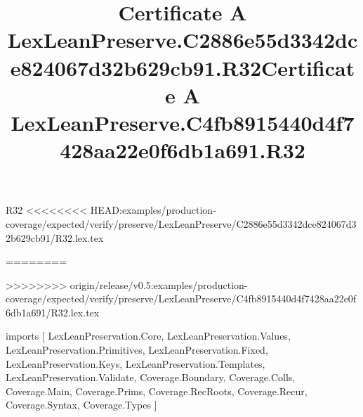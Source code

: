 \begin{lexlean}{R32}
<<<<<<<< HEAD:examples/production-coverage/expected/verify/preserve/LexLeanPreserve/C2886e55d3342dce824067d32b629cb91/R32.lex.tex
\title{Certificate A LexLeanPreserve.C2886e55d3342dce824067d32b629cb91.R32}
========
\title{Certificate A LexLeanPreserve.C4fb8915440d4f7428aa22e0f6db1a691.R32}
>>>>>>>> origin/release/v0.5:examples/production-coverage/expected/verify/preserve/LexLeanPreserve/C4fb8915440d4f7428aa22e0f6db1a691/R32.lex.tex
\begin{coremodule}
imports [
  LexLeanPreservation.Core,
  LexLeanPreservation.Values,
  LexLeanPreservation.Primitives,
  LexLeanPreservation.Fixed,
  LexLeanPreservation.Keys,
  LexLeanPreservation.Templates,
  LexLeanPreservation.Validate,
  Coverage.Boundary,
  Coverage.Colls,
  Coverage.Main,
  Coverage.Prims,
  Coverage.RecRoots,
  Coverage.Recur,
  Coverage.Syntax,
  Coverage.Types
]


\end{coremodule}
\end{lexlean}
